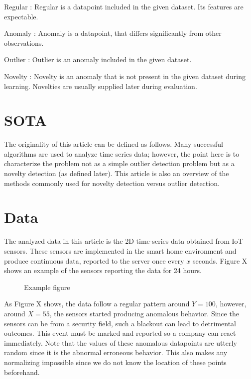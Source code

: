 \documentclass[preprint,12pt]{elsarticle}
\begin{document}
Regular
: Regular is a datapoint included in the given dataset. Its features are expectable.

Anomaly
: Anomaly is a datapoint, that differs significantly from other observations.

Outlier
: Outlier is an anomaly included in the given dataset. 

Novelty
: Novelty is an anomaly that is not present in the given dataset during learning. Novelties are usually supplied later during evaluation.

\section{SOTA}
The originality of this article can be defined as follows. 
Many successful algorithms are used to analyze time series data; however, the point here is to characterize the problem not as a simple outlier detection problem but as a novelty detection (as defined later). 
This article is also an overview of the methods commonly used for novelty detection versus outlier detection.

\section{Data}
The analyzed data in this article is the 2D time-series data obtained from IoT sensors. 
These sensors are implemented in the smart home environment and produce continuous data, reported to the server once every $x$ seconds.
Figure X shows an example of the sensors reporting the data for 24 hours.

\begin{figure}
\caption{Example figure}
\centering

\end{figure}


As Figure X shows, the data follow a regular pattern around $Y = 100$,
however, around $X= 55$, the sensors started producing anomalous behavior.
Since the sensors can be from a security field, such a blackout can lead to detrimental outcomes.
This event must be marked and reported so a company can react immediately.
Note that the values of these anomalous datapoints are utterly random since it is the abnormal erroneous behavior.
This also makes any normalizing impossible since we do not know the location of these points beforehand.



\appendix
\end{document}

